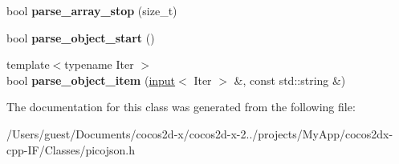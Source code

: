 \begin{DoxyCompactItemize}
\item 
\hypertarget{classpicojson_1_1deny__parse__context_ab284d5b0ee0e8df122d7e842a8d8e0b9}{bool {\bfseries parse\-\_\-array\-\_\-stop} (size\-\_\-t)}\label{classpicojson_1_1deny__parse__context_ab284d5b0ee0e8df122d7e842a8d8e0b9}

\item 
\hypertarget{classpicojson_1_1deny__parse__context_a344343a42dca7a25057e35077e517fbf}{bool {\bfseries parse\-\_\-object\-\_\-start} ()}\label{classpicojson_1_1deny__parse__context_a344343a42dca7a25057e35077e517fbf}

\item 
\hypertarget{classpicojson_1_1deny__parse__context_a08a8add290a938e71285f7b72a24b91c}{{\footnotesize template$<$typename Iter $>$ }\\bool {\bfseries parse\-\_\-object\-\_\-item} (\hyperlink{classpicojson_1_1input}{input}$<$ Iter $>$ \&, const std\-::string \&)}\label{classpicojson_1_1deny__parse__context_a08a8add290a938e71285f7b72a24b91c}

\end{DoxyCompactItemize}


The documentation for this class was generated from the following file\-:\begin{DoxyCompactItemize}
\item 
/\-Users/guest/\-Documents/cocos2d-\/x/cocos2d-\/x-\/2../projects/\-My\-App/cocos2dx-\/cpp-\/\-I\-F/\-Classes/picojson.\-h\end{DoxyCompactItemize}
